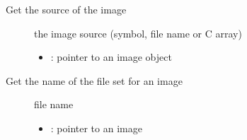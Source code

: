 \documentclass[letterpaper,10pt,english]{sphinxmanual}
\begin{document}

\begin{fulllineitems}
\label{\detokenize{object-types/img:_CPPv414lv_img_get_srcP8lv_obj_t}}%
\pysigstartmultiline
{}\label{\detokenize{object-types/img:lv__img_8h_1ab27772d74eba0faa88dade24a8ff67ee}}%
\pysigstopmultiline
Get the source of the image \begin{description}
\item[{}] \leavevmode
the image source (symbol, file name or C array) 

\item[{}] \leavevmode\begin{itemize}
\item {} 
: pointer to an image object 

\end{itemize}

\end{description}


\end{fulllineitems}


\begin{fulllineitems}
\label{\detokenize{object-types/img:_CPPv420lv_img_get_file_namePK8lv_obj_t}}%
\pysigstartmultiline
{}\label{\detokenize{object-types/img:lv__img_8h_1ac91e63034c652c1c3cabfd8c11dfd36f}}%
\pysigstopmultiline
Get the name of the file set for an image \begin{description}
\item[{}] \leavevmode
file name 

\item[{}] \leavevmode\begin{itemize}
\item {} 
: pointer to an image 

\end{itemize}

\end{description}


\end{fulllineitems}
\end{document}
